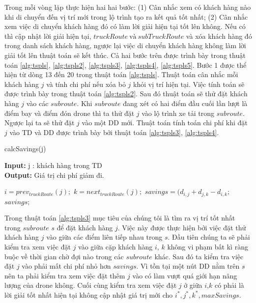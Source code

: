\documentclass[a4paper,12pt]{report}
\begin{document}
Trong mỗi vòng lặp thực hiện hai hai bước: (1) Cân nhắc xem có khách hàng nào khi di chuyển đến vị trí mới trong lộ trình tạo ra kết quả tốt nhất; (2) Cân nhắc xem việc di chuyển khách hàng đó có làm lời giải hiện tại tốt lên không. Nếu có thì cập nhật lời giải hiện tại, $truckRoute \ \text{và} \ subTruckRoute$ và xóa khách hàng đó trong danh sách khách hàng, ngược lại việc di chuyển khách hàng không làm lời giải tốt lên thuật toán sẽ kết thúc. Cả hai bước trên được trình bày trong thuật toán \ref{alg:tspls}, \ref{alg:tspls2}, \ref{alg:tspls3}, \ref{alg:tspls4}, \ref{alg:tspls5}.
Bước 1 được thể hiện từ dòng 13 đến 20 trong thuật toán \ref{alg:tspls}. Thuật toán cân nhắc mỗi khách hàng $j$ và tính chi phí nếu xóa bỏ $j$ khỏi vị trí hiện tại. Việc tính toán sẽ được trình bày trong thuật toán \ref{alg:tspls2}. Sau đó thuật toán sẽ thử đặt khách hàng $j$ vào các $subroute$. Khi $subroute$ đang xét có hai điểm đầu cuối lần lượt là điểm bay và điểm đón drone thì ta thử đặt $j$ vào lộ trình xe tải trong $subroute$. Ngược lại ta sẽ thử đặt $j$ vào một \ac{DD} mới. Thuật toán tính toán chi phí khi đặt $j$ vào \ac{TD} và \ac{DD} được trình bày bởi thuật toán \ref{alg:tspls3}, \ref{alg:tspls4}.   \\

\begin{algorithm}[H]
\caption{calcSavings(j)}
\textbf{Input:} j : khách hàng trong TD\\
\textbf{Output:} Giá trị chi phí giảm đi.
\begin{algorithmic}[1]
\State $i=prev_{truckRoute}(j);$
\State $k=next_{truckRoute}(j);$
\State $savings=(d_{i,j}+d_{j,k}-d_{i,k};$\\
\Return $savings;$
\end{algorithmic}

\label{alg:tspls2}
\end{algorithm}

Trong thuật toán \ref{alg:tspls3} mục tiêu của chúng tôi là tìm ra vị trí tốt nhất trong $subroute$ $s$ để đặt khách hàng $j$. Việc này được thực hiện bởi việc đặt thử khách hàng $j$ vào giữa các điểm liên tiếp nhau trong $s$. Đầu tiên chúng ta sẽ phải kiểm tra xem việc đặt $j$ vào giữa cặp khách hàng $i$, $k$ không vi phạm bất kì ràng buộc về thời gian chờ đợi nào trong các $subroute$ khác. Sau đó ta kiểm tra việc đặt $j$ vào phải mất chi phí nhỏ hơn $savings$. Vì tồn tại một nút \ac{DD} nằm trên $s$ nên ta phải kiểm tra xem việc đặt thêm $j$ vào có làm vượt quá giới hạn năng lượng của drone không. Cuối cùng kiểm tra xem việc đặt $j$ ở giữa $i$,$k$  có phải là lời giải tốt nhất hiện tại không cập nhật giá trị mới cho $i^*,j^*,k^*, maxSavings$.
\end{document}
